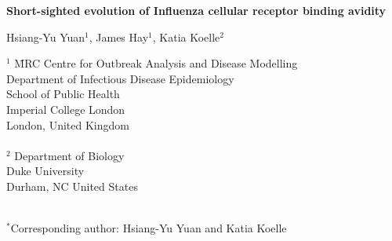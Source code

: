 \documentclass[12pt,a4paper]{article}
\begin{document}
\large {\bf Short-sighted evolution of Influenza cellular receptor binding avidity} \normalsize

Hsiang-Yu Yuan$^{1}$, James Hay$^{1}$, Katia Koelle$^{2}$

\begin{tabbing}
$^1$     \= MRC Centre for Outbreak Analysis and Disease Modelling \\
        \> Department of Infectious Disease Epidemiology \\
        \> School of Public Health \\
        \> Imperial College London \\
        \> London, United Kingdom \\ \\

$^2$    \> Department of Biology \\
            \> Duke University \\
            \> Durham, NC United States \\ \\
        

\end{tabbing}
\doublespacing
$^*$Corresponding author: Hsiang-Yu Yuan and Katia Koelle
\clearpage
\end{document}
